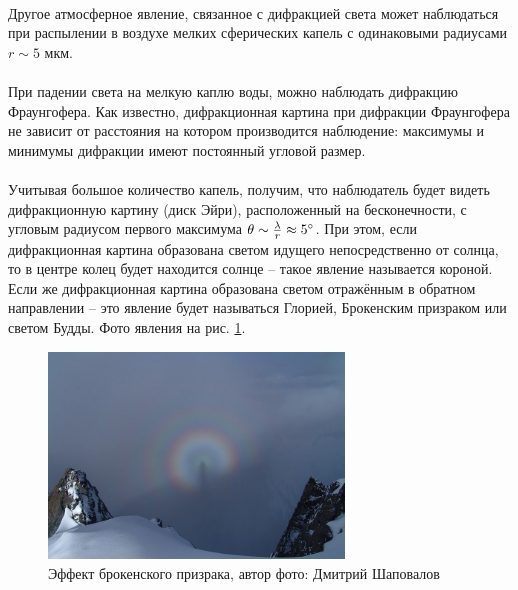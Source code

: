 \documentclass[a4paper,12pt]{article} %
\begin{document}
\paragraph{} Другое атмосферное явление, связанное с дифракцией света может наблюдаться при распылении в воздухе мелких сферических капель с одинаковыми радиусами $r \sim 5$ мкм.

\paragraph{} При падении света на мелкую каплю воды, можно наблюдать дифракцию Фраунгофера. Как известно, дифракционная картина при дифракции Фраунгофера не зависит от расстояния на котором производится наблюдение: максимумы и минимумы дифракции имеют постоянный угловой размер. 

\paragraph{} Учитывая большое количество капель, получим, что наблюдатель будет видеть дифракционную картину (диск Эйри), расположенный на бесконечности, с угловым радиусом первого максимума $\theta \sim \frac{\lambda}{r} \approx 5 \degree$. При этом, если дифракционная картина образована светом идущего непосредственно от солнца, то в центре колец будет находится солнце -- такое явление называется короной. Если же дифракционная картина образована светом отражённым в обратном направлении -- это явление будет называться Глорией, Брокенским призраком или светом Будды. Фото явления на рис. \ref{fig:glory}.

\begin{figure}[h]
\centering
\includegraphics[width=0.7\textwidth]{glory_dmitry_shapovalov.jpg}
\caption{Эффект брокенского призрака, автор фото: Дмитрий Шаповалов}
\label{fig:glory}
\end{figure}
\end{document}
